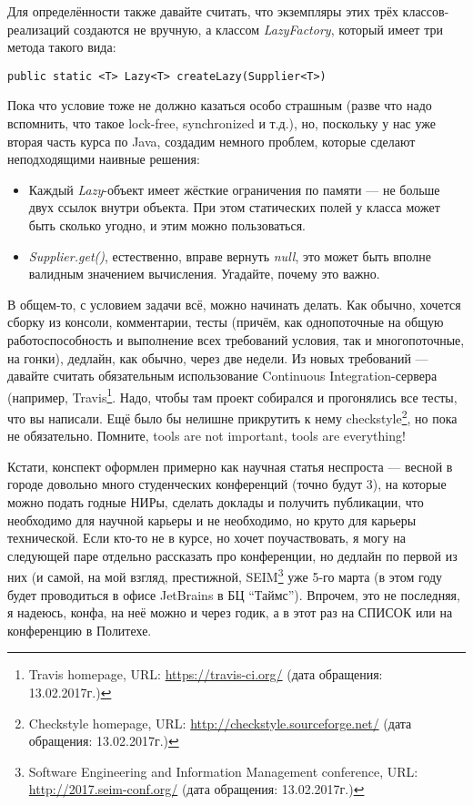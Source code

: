 \documentclass[a5paper]{article}
\begin{document}
Для определённости также давайте считать, что экземпляры этих трёх классов-реализаций создаются не вручную, а классом \textit{LazyFactory}, который имеет три метода такого вида:
\begin{verbatim}
public static <T> Lazy<T> createLazy(Supplier<T>)
\end{verbatim}

Пока что условие тоже не должно казаться особо страшным (разве что надо вспомнить, что такое lock-free, synchronized и т.д.), но, поскольку у нас уже вторая часть курса по Java, создадим немного проблем, которые сделают неподходящими наивные решения:
\begin{itemize}
	\item Каждый \textit{Lazy}-объект имеет жёсткие ограничения по памяти --- не больше двух ссылок внутри объекта. При этом статических полей у класса может быть сколько угодно, и этим можно пользоваться.
	\item \textit{Supplier.get()}, естественно, вправе вернуть \textit{null}, это может быть вполне валидным значением вычисления. Угадайте, почему это важно.
\end{itemize}

В общем-то, с условием задачи всё, можно начинать делать. Как обычно, хочется сборку из консоли, комментарии, тесты (причём, как однопоточные на общую работоспособность и выполнение всех требований условия, так и многопоточные, на гонки), дедлайн, как обычно, через две недели. Из новых требований --- давайте считать обязательным использование Continuous Integration-сервера (например, Travis\footnote{Travis homepage, URL: \url{https://travis-ci.org/} (дата обращения: 13.02.2017г.)}. Надо, чтобы там проект собирался и прогонялись все тесты, что вы написали. Ещё было бы нелишне прикрутить к нему checkstyle\footnote{Checkstyle homepage, URL: \url{http://checkstyle.sourceforge.net/} (дата обращения: 13.02.2017г.)}, но пока не обязательно. Помните, tools are not important, tools are everything!

Кстати, конспект оформлен примерно как научная статья неспроста --- весной в городе довольно много студенческих конференций (точно будут 3), на которые можно подать годные НИРы, сделать доклады и получить публикации, что необходимо для научной карьеры и не необходимо, но круто для карьеры технической. Если кто-то не в курсе, но хочет поучаствовать, я могу на следующей паре отдельно рассказать про конференции, но дедлайн по первой из них (и самой, на мой взгляд, престижной, SEIM\footnote{Software Engineering and Information Management conference, URL: \url{http://2017.seim-conf.org/} (дата обращения: 13.02.2017г.)} уже 5-го марта (в этом году будет проводиться в офисе JetBrains в БЦ ``Таймс''). Впрочем, это не последняя, я надеюсь, конфа, на неё можно и через годик, а в этот раз на СПИСОК или на конференцию в Политехе.
\end{document}
